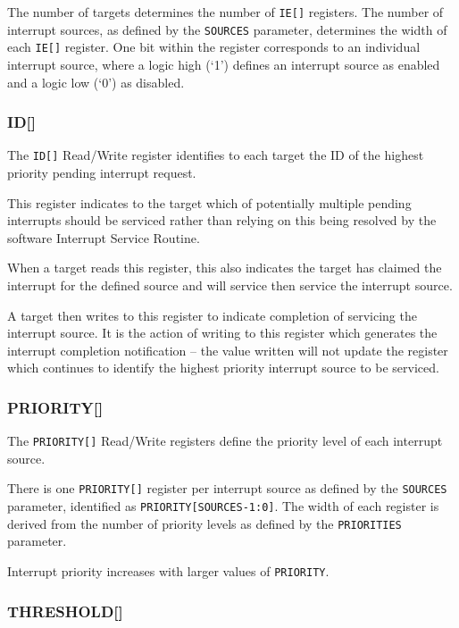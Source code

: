 The number of targets determines the number of \texttt{IE[]}
registers. The number of interrupt sources, as defined by the
\texttt{SOURCES} parameter, determines the
width of each \texttt{IE[]} register. One bit within the register
corresponds to an individual interrupt source, where a logic high (`1')
defines an interrupt source as enabled and a logic low (`0') as
disabled.

\subsubsection{ID[]}

The \texttt{ID[]} Read/Write register identifies to each target
the ID of the highest priority pending interrupt request.

This register indicates to the target which of potentially multiple
pending interrupts should be serviced rather than relying on this being
resolved by the software Interrupt Service Routine.

When a target reads this register, this also indicates the target has
claimed the interrupt for the defined source and will service then
service the interrupt source.

A target then writes to this register to indicate completion of
servicing the interrupt source. It is the action of writing to this
register which generates the interrupt completion notification -- the
value written will not update the register which continues to identify
the highest priority interrupt source to be serviced.

\subsubsection{PRIORITY[]}

The \texttt{PRIORITY[]} Read/Write registers define the priority level of each interrupt source.

There is one \texttt{PRIORITY[]} register per interrupt source as defined by the \texttt{SOURCES} parameter, identified as \texttt{PRIORITY[SOURCES-1:0]}. The width of each register is derived from the number of priority levels as defined by the \texttt{PRIORITIES} parameter.

Interrupt priority increases with larger values of \texttt{PRIORITY}.

\subsubsection{THRESHOLD[]}

